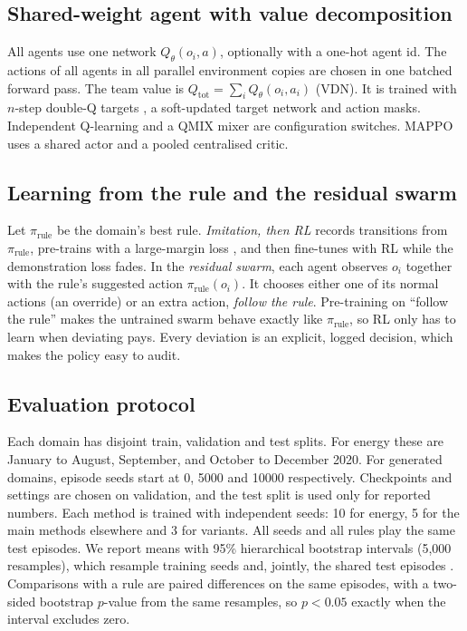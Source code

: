 \documentclass[11pt]{article}
\begin{document}
\subsection{Shared-weight agent with value decomposition}
All agents use one network $Q_\theta(o_i, a)$, optionally with a one-hot agent id. The actions of all agents in all parallel environment copies are chosen in one batched forward pass. The team value is $Q_{\text{tot}} = \sum_i Q_\theta(o_i, a_i)$ (VDN). It is trained with $n$-step double-Q targets \citep{vanhasselt2016double}, a soft-updated target network and action masks. Independent Q-learning and a QMIX mixer are configuration switches. MAPPO uses a shared actor and a pooled centralised critic.

\subsection{Learning from the rule and the residual swarm}
Let $\pi_{\text{rule}}$ be the domain's best rule. \emph{Imitation, then RL} records transitions from $\pi_{\text{rule}}$, pre-trains with a large-margin loss \citep{hester2018dqfd}, and then fine-tunes with RL while the demonstration loss fades. In the \emph{residual swarm}, each agent observes $o_i$ together with the rule's suggested action $\pi_{\text{rule}}(o_i)$. It chooses either one of its normal actions (an override) or an extra action, \emph{follow the rule}. Pre-training on ``follow the rule'' makes the untrained swarm behave exactly like $\pi_{\text{rule}}$, so RL only has to learn when deviating pays. Every deviation is an explicit, logged decision, which makes the policy easy to audit.

\subsection{Evaluation protocol}\label{sec:protocol}
Each domain has disjoint train, validation and test splits. For energy these are January to August, September, and October to December 2020. For generated domains, episode seeds start at 0, 5000 and 10000 respectively. Checkpoints and settings are chosen on validation, and the test split is used only for reported numbers. Each method is trained with independent seeds: 10 for energy, 5 for the main methods elsewhere and 3 for variants. All seeds and all rules play the same test episodes. We report means with 95\% hierarchical bootstrap intervals (5{,}000 resamples), which resample training seeds and, jointly, the shared test episodes \citep{agarwal2021rliable}. Comparisons with a rule are paired differences on the same episodes, with a two-sided bootstrap $p$-value from the same resamples, so $p<0.05$ exactly when the interval excludes zero.
\end{document}

